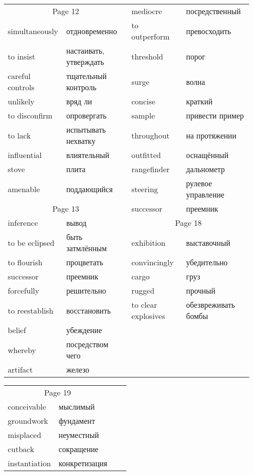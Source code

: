 \documentclass[12pt]{article}
\begin{document}
\begin{tabular}{| l l | l l | }
  \multicolumn{2}{c|}{Page 12} & mediocre & посредственный \\
  simultaneously & отдновременно & to outperform & превосходить \\
  to insist & настаивать, утверждать & threshold & порог \\
  careful controls & тщательный контроль& surge & волна \\
  unlikely & вряд ли & concise & краткий \\
  to disconfirm & опровергать & sample & привести пример \\
  to lack & испытывать нехватку & throughout & на протяжении \\
  influential & влиятельный & outfitted & оснащённый \\
  stove & плита & rangefinder & дальнометр \\
  amenable & поддающийся & steering & рулевое управление \\ \cline{1-2}
  
  \multicolumn{2}{c|}{Page 13} &  successor & преемник \\ \cline{3-4}
  inference & вывод & \multicolumn{2}{c|}{Page 18} \\
  to be eclipsed & быть затмлённым & exhibition & выставочный \\
  to flourish & процветать & convincingly & убедительно \\
  successor & преемник & cargo & груз \\
  forcefully & решительно & rugged & прочный \\
  to reestablish & восстановить & to clear explosives & обезвреживать бомбы \\
  belief & убеждение\\
  whereby & посредством чего \\
  artifact & железо \\
  
  
  \hline

\end{tabular}



\begin{tabular}{| l l | l l | }
  \hline
  \multicolumn{2}{c|}{Page 19} \\
  conceivable & мыслимый \\
  groundwork & фундамент \\
  misplaced & неуместный \\
  cutback & сокращение \\
  instantiation & конкретизация  \\



  
  
  \hline

\end{tabular}
\end{document}

